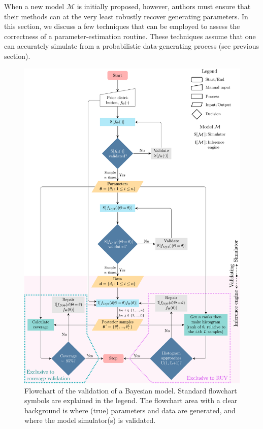 \documentclass[oneside]{article}
\begin{document}
When a new model $\mathcal{M}$ is initially proposed, however, authors must ensure that their methods 
can at the very least robustly recover generating parameters.
In this section, we discuss a few techniques that can be employed to assess the correctness of a parameter-estimation routine.
These techniques assume that one can accurately simulate from a
probabilistic data-generating process (see previous section).
\begin{figure}
  \centering
  \includegraphics[width=13cm]{../figures/flowchart_manual2.pdf}
  \caption{Flowchart of the validation of a Bayesian model.
    Standard flowchart symbols are explained in the legend.
    The flowchart area with a clear background is where (true) parameters and data are generated, and where the model simulator(s) is validated.
}
\end{figure}
\end{document}
